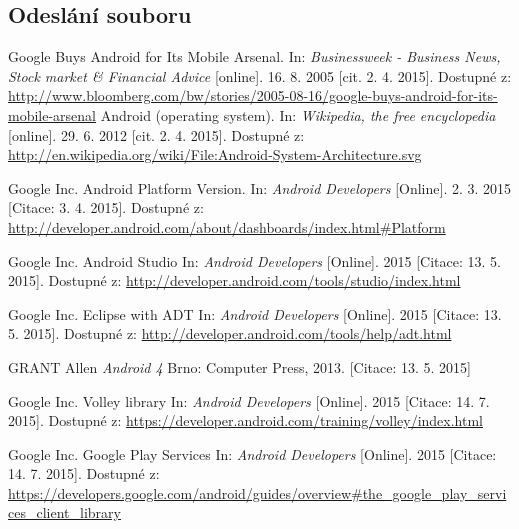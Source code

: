 \documentclass[12pt]{article}
\begin{document}
\subsection{Odeslání souboru}
\label{knihovny}
\newpage
\begin{thebibliography}{1} %
 Google Buys Android for Its Mobile Arsenal. In: \emph{Businessweek - Business News, Stock market \& Financial Advice} [online]. 16. 8. 2005 [cit. 2. 4. 2015]. Dostupné
z: \url{http://www.bloomberg.com/bw/stories/2005-08-16/google-buys-android-for-its-mobile-arsenal}
 Android (operating system). In: \emph{Wikipedia, the free encyclopedia} [online]. 29. 6. 2012 [cit. 2. 4. 2015]. Dostupné z: \url{http://en.wikipedia.org/wiki/File:Android-System-Architecture.svg}

 Google Inc. Android Platform Version. In: \emph{Android Developers}
[Online]. 2. 3. 2015 [Citace: 3. 4. 2015]. Dostupné z: \url{http://developer.android.com/about/dashboards/index.html#Platform}

 Google Inc. Android Studio In: \emph{Android Developers}
[Online]. 2015 [Citace: 13. 5. 2015]. Dostupné z: \url{http://developer.android.com/tools/studio/index.html}

 Google Inc. Eclipse with ADT In: \emph{Android Developers}
[Online]. 2015 [Citace: 13. 5. 2015]. Dostupné z: \url{http://developer.android.com/tools/help/adt.html}

 GRANT Allen \emph{Android 4}
	Brno: Computer Press, 2013.
		[Citace: 13. 5. 2015]

 Google Inc. Volley library In: \emph{Android Developers}
[Online]. 2015 [Citace: 14. 7. 2015]. Dostupné z:
\url{https://developer.android.com/training/volley/index.html}

 Google Inc. Google Play Services In: \emph{Android Developers}
[Online]. 2015 [Citace: 14. 7. 2015]. Dostupné z:
\url{https://developers.google.com/android/guides/overview#the_google_play_services_client_library}
\end{thebibliography}
\end{document}
